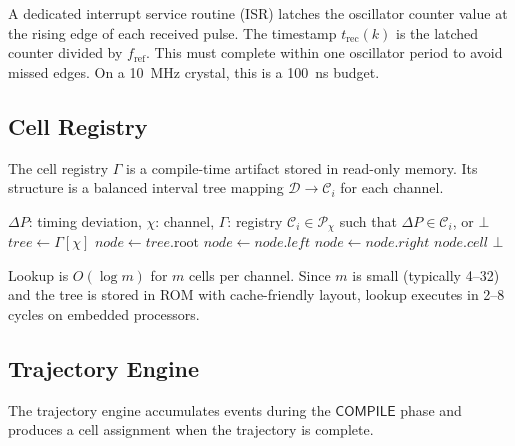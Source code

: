 \documentclass[twocolumn,10pt]{article}
\newcommand{\DP}{\Delta P}          %
\newcommand{\trec}{t_{\mathrm{rec}}}
\newcommand{\fref}{f_{\mathrm{ref}}}
\newcommand{\calC}{\mathcal{C}}     %
\newcommand{\calD}{\mathcal{D}}     %
\newcommand{\calP}{\mathcal{P}}     %
\begin{document}
A dedicated interrupt service routine (ISR) latches the oscillator
counter value at the rising edge of each received pulse.
The timestamp $\trec(k)$ is the latched counter divided by $\fref$.
This must complete within one oscillator period to avoid missed edges.
On a 10~MHz crystal, this is a 100~ns budget.

\subsection{Cell Registry}

The cell registry $\Gamma$ is a compile-time artifact stored in
read-only memory. Its structure is a balanced interval tree mapping
$\calD \to \calC_i$ for each channel.

\begin{algorithm}[ht]
\caption{Cell Registry Lookup}
\label{alg:lookup}
\begin{algorithmic}[1]
\Require $\DP$: timing deviation, $\chi$: channel, $\Gamma$: registry
\Ensure $\calC_i \in \calP_\chi$ such that $\DP \in \calC_i$, or $\bot$
\State $\mathit{tree} \gets \Gamma[\chi]$
\State $\mathit{node} \gets \mathit{tree}.\mathrm{root}$
  \If{$\DP < \mathit{node}.\mathit{lo}$}
    \State $\mathit{node} \gets \mathit{node}.\mathit{left}$
  \ElsIf{$\DP > \mathit{node}.\mathit{hi}$}
    \State $\mathit{node} \gets \mathit{node}.\mathit{right}$
  \Else
    \State \Return $\mathit{node}.\mathit{cell}$
  \EndIf
\EndWhile
\State \Return $\bot$
\end{algorithmic}
\end{algorithm}

Lookup is $O(\log m)$ for $m$ cells per channel. Since $m$ is small
(typically 4--32) and the tree is stored in ROM with cache-friendly
layout, lookup executes in 2--8 cycles on embedded processors.

\subsection{Trajectory Engine}

The trajectory engine accumulates events during the $\mathsf{COMPILE}$
phase and produces a cell assignment when the trajectory is complete.
\end{document}

